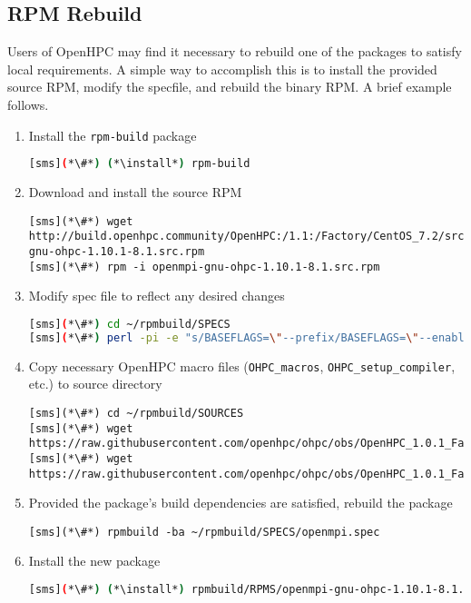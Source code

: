 \subsection{RPM Rebuild}  \label{appendix:rpmbuild}

Users of OpenHPC may find it necessary to rebuild one of the packages to satisfy
local requirements. A simple way to accomplish this is to install the provided
source RPM, modify the specfile, and rebuild the binary RPM. A brief example
follows.

\begin{enumerate}
\item Install the \texttt{rpm-build} package

\begin{lstlisting}[language=bash,keywords={}]
[sms](*\#*) (*\install*) rpm-build
\end{lstlisting}

\item Download and install the source RPM 
\begin{lstlisting}
[sms](*\#*) wget http://build.openhpc.community/OpenHPC:/1.1:/Factory/CentOS_7.2/src/openmpi-gnu-ohpc-1.10.1-8.1.src.rpm
[sms](*\#*) rpm -i openmpi-gnu-ohpc-1.10.1-8.1.src.rpm
\end{lstlisting}

\item Modify spec file to reflect any desired changes

\begin{lstlisting}[language=bash,keywords={}]
[sms](*\#*) cd ~/rpmbuild/SPECS
[sms](*\#*) perl -pi -e "s/BASEFLAGS=\"--prefix/BASEFLAGS=\"--enable-mpi-thread-multiple --prefix/" openmpi.spec
\end{lstlisting}

\item Copy necessary OpenHPC macro files (\texttt{OHPC\_macros}, 
\texttt{OHPC\_setup\_compiler}, etc.) to source directory

\begin{lstlisting}
[sms](*\#*) cd ~/rpmbuild/SOURCES
[sms](*\#*) wget https://raw.githubusercontent.com/openhpc/ohpc/obs/OpenHPC_1.0.1_Factory/components/OHPC_macros
[sms](*\#*) wget https://raw.githubusercontent.com/openhpc/ohpc/obs/OpenHPC_1.0.1_Factory/components/OHPC_setup_compiler
\end{lstlisting}

\item Provided the package's build dependencies are satisfied, rebuild the
package

\begin{lstlisting}
[sms](*\#*) rpmbuild -ba ~/rpmbuild/SPECS/openmpi.spec
\end{lstlisting}

\item Install the new package

\begin{lstlisting}[language=bash,keywords={}]
[sms](*\#*) (*\install*) rpmbuild/RPMS/openmpi-gnu-ohpc-1.10.1-8.1.x86_64
\end{lstlisting}
\end{enumerate}
